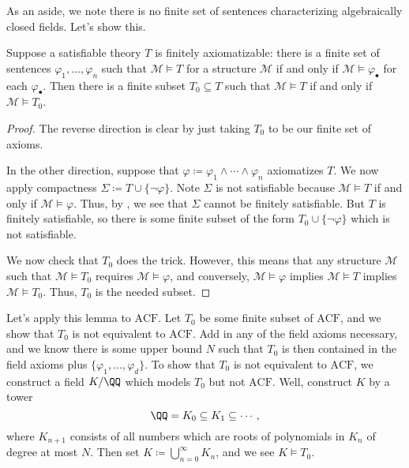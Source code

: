 \documentclass[../notes.tex]{subfiles}
\begin{document}
As an aside, we note there is no finite set of sentences characterizing algebraically closed fields. Let's show this.
\begin{lemma}
	Suppose a satisfiable theory $T$ is finitely axiomatizable: there is a finite set of sentences $\varphi_1,\ldots,\varphi_n$ such that $\mathcal M\models T$ for a structure $\mathcal M$ if and only if $\mathcal M\models\varphi_\bullet$ for each $\varphi_\bullet$. Then there is a finite subset $T_0\subseteq T$ such that $\mathcal M\models T$ if and only if $\mathcal M\models T_0$.
\end{lemma}
\begin{proof}
	The reverse direction is clear by just taking $T_0$ to be our finite set of axioms.
	
	In the other direction, suppose that $\varphi\coloneqq\varphi_1\land\cdots\land\varphi_n$ axiomatizes $T$. We now apply compactness $\Sigma\coloneqq T\cup\{\lnot\varphi\}$. Note $\Sigma$ is not satisfiable because $\mathcal M\models T$ if and only if $\mathcal M\models\varphi$. Thus, by , we see that $\Sigma$ cannot be finitely satisfiable. But $T$ is finitely satisfiable, so there is some finite subset of the form $T_0\cup\{\lnot\varphi\}$ which is not satisfiable.
	
	We now check that $T_0$ does the trick. However, this means that any structure $\mathcal M$ such that $\mathcal M\models T_0$ requires $\mathcal M\models\varphi$, and conversely, $\mathcal M\models\varphi$ implies $\mathcal M\models T$ implies $\mathcal M\models T_0$. Thus, $T_0$ is the needed subset.
\end{proof}
Let's apply this lemma to $\mathrm{ACF}$. Let $T_0$ be some finite subset of $\mathrm{ACF}$, and we show that $T_0$ is not equivalent to $\mathrm{ACF}$. Add in any of the field axioms necessary, and we know there is some upper bound $N$ such that $T_0$ is then contained in the field axioms plus $\{\varphi_1,\ldots,\varphi_d\}$. To show that $T_0$ is not equivalent to $\mathrm{ACF}$, we construct a field $K/\QQ$ which models $T_0$ but not $\mathrm{ACF}$. Well, construct $K$ by a tower
\[\QQ=K_0\subseteq K_1\subseteq\cdots,\]
where $K_{n+1}$ consists of all numbers which are roots of polynomials in $K_n$ of degree at most $N$. Then set $K\coloneqq\bigcup_{n=0}^\infty K_n$, and we see $K\models T_0$.
\end{document}
